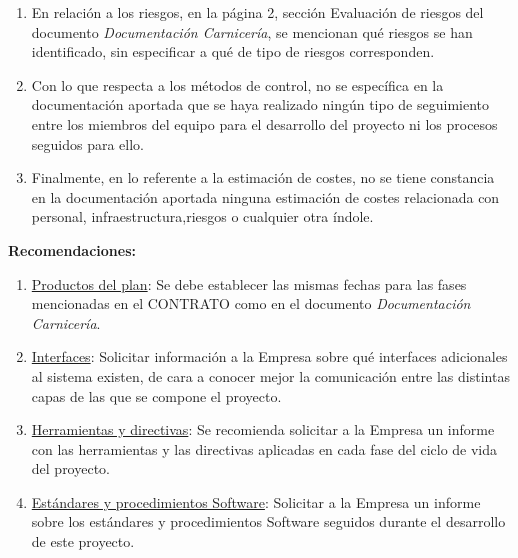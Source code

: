 \documentclass[a4paper,12pt]{report}
\begin{document}
\begin{enumerate}
\begin{enumerate}
            \item En relación a los riesgos, en la página 2, sección Evaluación de riesgos
            del documento \textit{Documentación Carnicería}, se mencionan qué riesgos se han identificado, sin especificar a qué de tipo de riesgos corresponden.\label{riesgos}
            
            \item Con lo que respecta a los métodos de control, no se específica en la documentación
            aportada que se haya realizado ningún tipo de seguimiento entre los miembros del
            equipo para el desarrollo del proyecto ni los procesos seguidos para ello.\label{control}
            
            \item Finalmente, en lo referente a la estimación de costes, no se tiene constancia en la
            documentación aportada ninguna estimación de costes relacionada con personal,
            infraestructura,riesgos o cualquier otra índole.\label{costes}
        \end{enumerate}
        
        \textbf{Recomendaciones:}
            \begin{enumerate}
                \item  \hyperref[productos]{Productos del plan}: Se debe
                establecer las mismas fechas para las fases mencionadas en
                el CONTRATO como en el documento \textit{Documentación
                Carnicería}.
                
                \item  \hyperref[interfaces]{Interfaces}: Solicitar
                información a la Empresa
                sobre qué interfaces adicionales al sistema existen, de cara a conocer mejor
                la comunicación entre las distintas capas de las que se compone el proyecto.
                
                \item  \hyperref[herramientas]{Herramientas y directivas}: Se recomienda solicitar
                a la Empresa un informe con las herramientas y las directivas aplicadas en
                cada fase del ciclo de vida del proyecto.
                
                \item  \hyperref[procedimientos]{Estándares y procedimientos Software}: Solicitar 
                a la Empresa un informe sobre los estándares y procedimientos Software
                seguidos durante el desarrollo de este proyecto.
                

\end{enumerate}
\end{enumerate}
\end{document}
